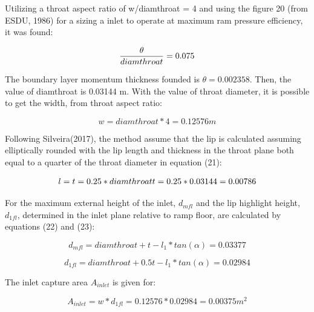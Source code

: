 Utilizing a throat aspect ratio of w/diamthroat = 4 and using the figure 20 (from ESDU, 1986) for a sizing a inlet to operate at maximum ram pressure efficiency, it was found:

\begin{equation}
    \frac{\theta}{diamthroat} = 0.075\\
\end{equation}

The boundary layer momentum thickness founded is \begin{math} \theta = 0.002358 \end{math}. Then, the value of diamthroat is 0.03144 m. With the value of throat diameter, it is possible to get the width, from throat aspect ratio:

\begin{equation}
    w = diamthroat*4 = 0.12576 m
\end{equation}

Following Silveira(2017), the method assume that the lip is calculated assuming elliptically rounded with the lip length and thickness in the throat plane both equal to a quarter of the throat diameter in equation (21):

\begin{equation}
    l = t = 0.25*diamthroat\\
    t = 0.25*0.03144 = 0.00786\\ 
\end{equation}

For the maximum external height of the inlet, \begin{math} d_{mfl} \end{math} and the lip highlight height, \begin{math} d_{1fl} \end{math}, determined in the inlet plane relative to ramp floor, are calculated by equations (22) and (23):

\begin{equation}
    d_{mfl} = diamthroat + t - l_1*tan(\alpha) = 0.03377
\end{equation}

\begin{equation}
d_{1fl} = diamthroat + 0.5t - l_1*tan(\alpha) = 0.02984
\end{equation}

The inlet capture area \begin{math} A_{inlet} \end{math} is given for:

\begin{equation}

A_{inlet} = w*d_{1fl} = 0.12576*0.02984 = 0.00375 m^2

\end{equation}

